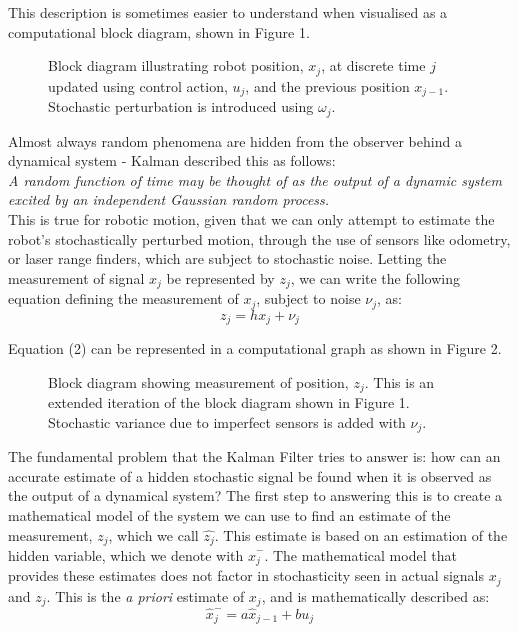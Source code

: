 \documentclass[a4paper]{article}
\begin{document}
This description is sometimes easier to understand when visualised as a computational block diagram, shown in Figure 1.
\begin{figure}[h]
\centering

\caption{Block diagram illustrating robot position, $x_j$, at discrete time $j$ updated using control action, $u_j$, and the previous position $x_{j-1}$. Stochastic perturbation is introduced using $\omega_j$.}
\end{figure}

Almost always random phenomena are hidden from the observer behind a dynamical system - Kalman described this as follows:\\

\textit{A random function of time may be thought of as the output of a dynamic system excited by an independent Gaussian random process.} \cite{Kalman:1960}\\

This is true for robotic motion, given that we can only attempt to estimate the robot's stochastically perturbed motion, through the use of sensors like odometry, or laser range finders, which are subject to stochastic noise. Letting the measurement of signal $x_j$ be represented by $z_j$, we can write the following equation defining the measurement of $x_j$, subject to noise $\nu_j$, as:
\begin{equation}
z_j = h x_j + \nu_j
\end{equation} 

Equation (2) can be represented in a computational graph as shown in Figure 2.

\newpage

\begin{figure}[h]
\centering

\caption{Block diagram showing measurement of position, $z_j$. This is an extended iteration of the block diagram shown in Figure 1. Stochastic variance due to imperfect sensors is added with $\nu_j$.}
\end{figure}

The fundamental problem that the Kalman Filter tries to answer is: how can an accurate estimate of a hidden stochastic signal be found when it is observed as the output of a dynamical system? The first step to answering this is to create a mathematical model of the system we can use to find an estimate of the measurement, $z_j$, which we call $\hat{z_j}$. This estimate is based on an estimation of the hidden variable, which we denote with $\hat{x}^-_j$. The mathematical model that provides these estimates does not factor in stochasticity seen in actual signals $x_j$ and $z_j$. This is the \textit{a priori} estimate of $x_j$, and is mathematically described as:
\begin{equation}
\hat{x}^-_j = a \hat{x}_{j-1} + b u_j
\end{equation}
\end{document}
